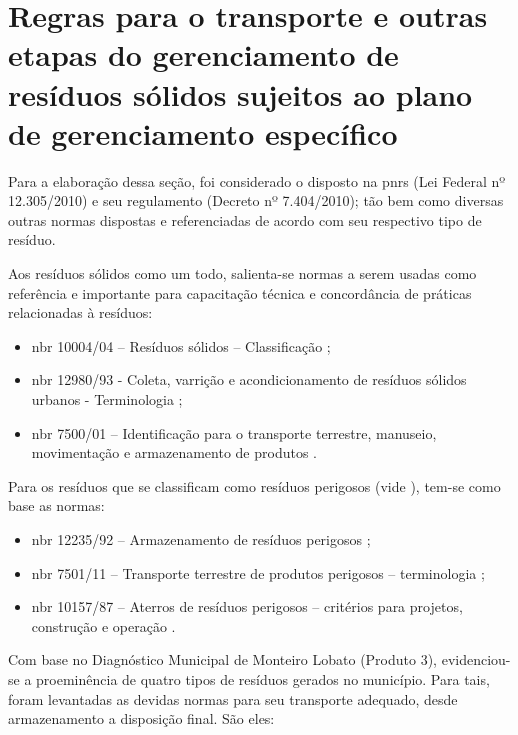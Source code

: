 \newpage
\FloatBarrier
\section{Regras para o transporte e outras etapas do gerenciamento de resíduos sólidos sujeitos ao plano de gerenciamento específico}
\label{sec:regras_trans}

Para a elaboração dessa seção, foi considerado o disposto na \gls{pnrs} (Lei Federal nº 12.305/2010) e seu regulamento (Decreto nº 7.404/2010); tão bem como diversas outras normas dispostas e referenciadas de acordo com seu respectivo tipo de resíduo.

Aos resíduos sólidos como um todo, salienta-se normas a serem usadas como referência e importante para capacitação técnica e concordância de práticas relacionadas à resíduos:

\begin{itemize}
	\item \gls{nbr} 10004/04 – Resíduos sólidos – Classificação \cite{abnt:10004};
	\item \gls{nbr} 12980/93 - Coleta, varrição e acondicionamento de resíduos sólidos urbanos - Terminologia \cite{abnt:12980:1993};
	\item \gls{nbr} 7500/01 – Identificação para o transporte terrestre, manuseio, movimentação e armazenamento de produtos \cite{abnt:7500:2001}.
\end{itemize}

Para os resíduos que se classificam como resíduos perigosos (vide \cite{abnt:10004}), tem-se como base as normas:

\begin{itemize}
	\item \gls{nbr} 12235/92 – Armazenamento de resíduos perigosos \cite{abnt:12235:1992};
	\item \gls{nbr} 7501/11 – Transporte terrestre de produtos perigosos – terminologia \cite{abnt:7501:2011}; 
	\item \gls{nbr} 10157/87 – Aterros de resíduos perigosos – critérios para projetos, construção e operação \cite{abnt:10157:1987}.
\end{itemize}

Com base no Diagnóstico Municipal de Monteiro Lobato (Produto 3), evidenciou-se a proeminência de quatro tipos de resíduos gerados no município. Para tais, foram levantadas as devidas normas para seu transporte adequado, desde armazenamento a disposição final. São eles:

